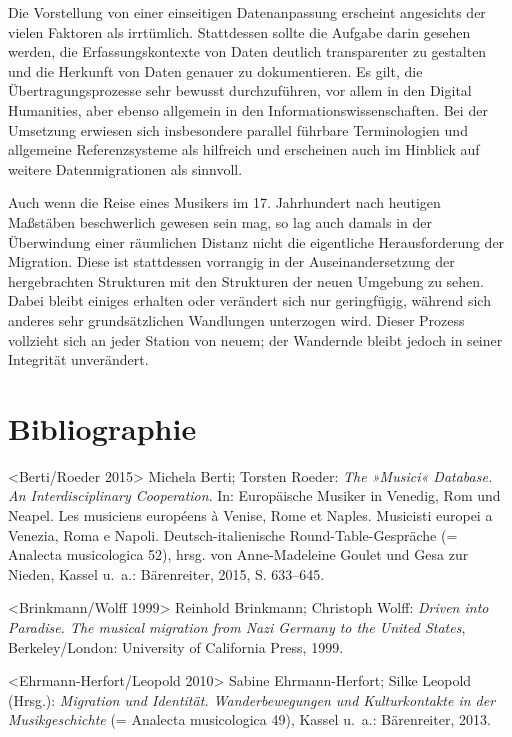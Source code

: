 \documentclass[a4paper,
fontsize=11pt,
oneside,
numbers=noperiodatend,
parskip=half-,
bibliography=totoc,
final
]{scrartcl}
\begin{document}
Die Vorstellung von einer einseitigen Datenanpassung erscheint
angesichts der vielen Faktoren als irrtümlich. Stattdessen sollte die
Aufgabe darin gesehen werden, die Erfassungskontexte von Daten deutlich
transparenter zu gestalten und die Herkunft von Daten genauer zu
dokumentieren. Es gilt, die Übertragungsprozesse sehr bewusst
durchzuführen, vor allem in den Digital Humanities, aber ebenso
allgemein in den Informationswissenschaften. Bei der Umsetzung erwiesen
sich insbesondere parallel führbare Terminologien und allgemeine
Referenzsysteme als hilfreich und erscheinen auch im Hinblick auf
weitere Datenmigrationen als sinnvoll.

Auch wenn die Reise eines Musikers im 17. Jahrhundert nach heutigen
Maßstäben beschwerlich gewesen sein mag, so lag auch damals in der
Überwindung einer räumlichen Distanz nicht die eigentliche
Herausforderung der Migration. Diese ist stattdessen vorrangig in der
Auseinandersetzung der hergebrachten Strukturen mit den Strukturen der
neuen Umgebung zu sehen. Dabei bleibt einiges erhalten oder verändert
sich nur geringfügig, während sich anderes sehr grundsätzlichen
Wandlungen unterzogen wird. Dieser Prozess vollzieht sich an jeder
Station von neuem; der Wandernde bleibt jedoch in seiner Integrität
unverändert.

\section*{Bibliographie}\label{bibliographie}

\textless{}Berti/Roeder 2015\textgreater{} Michela Berti; Torsten
Roeder: \emph{The »Musici« Database. An Interdisciplinary Cooperation}.
In: Europäische Musiker in Venedig, Rom und Neapel. Les musiciens
européens à Venise, Rome et Naples. Musicisti europei a Venezia, Roma e
Napoli. Deutsch-italienische Round-Table-Gespräche (= Analecta
musicologica 52), hrsg. von Anne-Madeleine Goulet und Gesa zur Nieden,
Kassel u.~a.: Bärenreiter, 2015, S. 633--645.

\textless{}Brinkmann/Wolff 1999\textgreater{} Reinhold Brinkmann;
Christoph Wolff: \emph{Driven into Paradise. The musical migration from
Nazi Germany to the United States}, Berkeley/London: University of
California Press, 1999.

\textless{}Ehrmann-Herfort/Leopold 2010\textgreater{} Sabine
Ehrmann-Herfort; Silke Leopold (Hrsg.): \emph{Migration und Identität.
Wanderbewegungen und Kulturkontakte in der Musikgeschichte} (= Analecta
musicologica 49), Kassel u.~a.: Bärenreiter, 2013.
\end{document}
